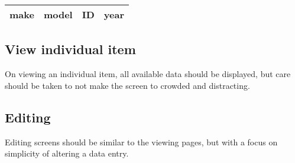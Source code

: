 \documentclass[titlepage]{article}
\begin{document}
            \begin{tabular}{|l|l|l|l|} \hline
                make & model & ID & year \\ \hline

            \end{tabular}

        \subsection{View individual item}
            On viewing an individual item, all available data should be displayed, but care
            should be taken to not make the screen to crowded and distracting.

        \subsection{Editing}
            Editing screens should be similar to the viewing pages, but with a focus on
            simplicity of altering a data entry.
\end{document}
